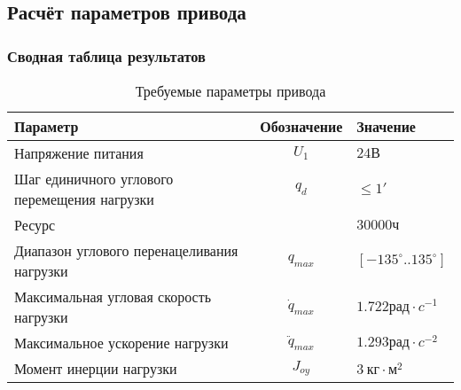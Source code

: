 \subsection{Расчёт параметров привода}



\newpage
\subsubsection{Сводная таблица результатов}

\begin{table}[h!]
    \centering
    \begin{tabular}{|l|c|l|}
        \hline
        Параметр                                    & Обозначение      & Значение                           \\
        \hline
        Напряжение питания                          & $U_1$            & $24 \textit{В} $                   \\
        Шаг единичного углового перемещения нагрузки& $q_d$            & $ \le 1' $                         \\
        Ресурс                                      &                  & $30000 \textit{ч} $                \\
        Диапазон углового перенацеливания нагрузки  & $q_{max}$        & $[-135^\circ .. 135^\circ] $       \\
        Максимальная угловая скорость нагрузки      & $\dot{q}_{max}$  & $1.722 \textit{рад} \cdot \textit{c}^{-1}$ \\
        Максимальное ускорение нагрузки             & $\ddot{q}_{max}$ & $1.293 \textit{рад} \cdot \textit{c}^{-2}$ \\
        Момент инерции нагрузки                     & $J_{oy}$         & $3 ~\textit{кг} \cdot \textit{м}^2 $   \\
        \hline
    \end{tabular}
    \caption{Требуемые параметры привода}
    \label{drive_parameters_tbl}
\end{table}

\endinput

